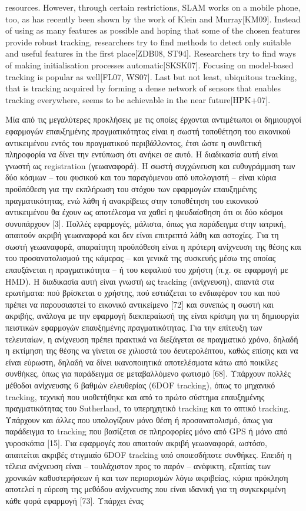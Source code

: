 resources. However, through certain restrictions, SLAM works on a mobile phone, too, as has recently been shown by the work of Klein and Murray[KM09]. Instead of using as many features as possible and hoping that some of the chosen features provide robust tracking, researchers try to find methods to detect only suitable and useful features in the first place[ZDB08, ST94]. Researchers try to find ways of making initialisation processes automatic[SKSK07]. Focusing on model-based tracking is popular as well[FL07, WS07]. Last but not least, ubiquitous tracking, that is tracking acquired by forming a dense network of sensors that enables tracking everywhere, seems to be achievable in the near future[HPK+07].


Μία από τις μεγαλύτερες προκλήσεις με τις οποίες έρχονται αντιμέτωποι οι δημιουργοί εφαρμογών επαυξημένης πραγματικότητας είναι η σωστή τοποθέτηση του εικονικού αντικειμένου εντός του πραγματικού περιβάλλοντος, έτσι ώστε η συνθετική πληροφορία να δίνει την εντύπωση ότι ανήκει σε αυτό. Η διαδικασία αυτή είναι γνωστή ως registration (γεωαναφορά). Η σωστή συγχώνευση και ευθυγράμμιση των δύο κόσμων – του φυσικού και του παραγόμενου από υπολογιστή – είναι κύρια προϋπόθεση για την εκπλήρωση του στόχου των εφαρμογών επαυξημένης πραγματικότητας, ενώ λάθη ή ανακρίβειες στην τοποθέτηση του εικονικού αντικειμένου θα έχουν ως αποτέλεσμα να χαθεί η ψευδαίσθηση ότι οι δύο κόσμοι συνυπάρχουν [3]. Πολλές εφαρμογές, μάλιστα, όπως για παράδειγμα στην ιατρική, απαιτούν ακριβή γεωαναφορά και δεν είναι επιτρεπτά λάθη και αστοχίες. Για τη σωστή γεωαναφορά, απαραίτητη προϋπόθεση είναι η πρότερη ανίχνευση της θέσης και του προσανατολισμού της κάμερας – και γενικά της συσκευής μέσω της οποίας επαυξάνεται η πραγματικότητα – ή του κεφαλιού του χρήστη (π.χ. σε εφαρμογή με HMD). Η διαδικασία αυτή είναι γνωστή ως tracking (ανίχνευση), απαντά στα ερωτήματα: πού βρίσκεται ο χρήστης, πού εστιάζεται το ενδιαφέρον του και πού πρέπει να παρουσιαστεί το εικονικό αντικείμενο [72] και συνεπώς η σωστή και ακριβής, ανάλογα με την εφαρμογή διεκπεραίωσή της είναι κρίσιμη για τη δημιουργία πειστικών εφαρμογών επαυξημένης πραγματικότητας. Για την επίτευξη των τελευταίων, η ανίχνευση πρέπει πρακτικά να διεξάγεται σε πραγματικό χρόνο, δηλαδή η εκτίμηση της θέσης να γίνεται σε χιλιοστά του δευτερολέπτου, καθώς επίσης και να είναι εύρωστη, δηλαδή να δίνει ικανοποιητικά αποτελέσματα κάτω από ποικίλες συνθήκες, όπως για παράδειγμα σε μεταβαλλόμενο φωτισμό [68]. Υπάρχουν πολλές μέθοδοι ανίχνευσης 6 βαθμών ελευθερίας (6DOF tracking), όπως το μηχανικό tracking, τεχνική που υιοθετήθηκε και από το πρώτο σύστημα επαυξημένης πραγματικότητας του Sutherland, το υπερηχητικό tracking και το οπτικό tracking. Υπάρχουν και άλλες που υπολογίζουν μόνο θέση ή προσανατολισμό, όπως για παράδειγμα το tracking που βασίζεται σε πληροφορίες μόνο από GPS ή μόνο από γυροσκόπια [15]. Για εφαρμογές που απαιτούν ακριβή γεωαναφορά, ωστόσο, απαιτείται ακριβές στιγμιαίο 6DOF tracking υπό οποιεσδήποτε συνθήκες. Επειδή η τέλεια ανίχνευση είναι – τουλάχιστον προς το παρόν – ανέφικτη, εξαιτίας των χρονικών καθυστερήσεων ή και των περιορισμών λόγω ακριβείας, κύρια πρόκληση αποτελεί η εύρεση της μεθόδου ανίχνευσης που είναι ιδανική για τη συγκεκριμένη κάθε φορά εφαρμογή [73]. Υπάρχει ένας 